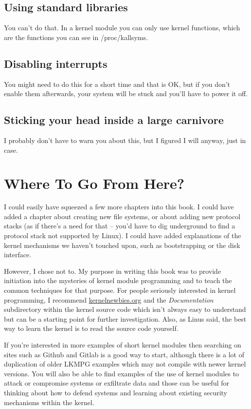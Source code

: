\documentclass[11pt]{article}
\begin{document}
\subsection{Using standard libraries}
\label{sec:orgba512d5}
You can't do that. In a kernel module you can only use kernel functions, which are the functions you can see in /proc/kallsyms.

\subsection{Disabling interrupts}
\label{sec:org377e4a8}
You might need to do this for a short time and that is OK, but if you don't enable them afterwards, your system will be stuck and you'll have to power it off.

\subsection{Sticking your head inside a large carnivore}
\label{sec:orgc0f5914}
I probably don't have to warn you about this, but I figured I will anyway, just in case.

\section{Where To Go From Here?}
\label{sec:org0a4192c}
I could easily have squeezed a few more chapters into this book. I could have added a chapter about creating new file systems, or about adding new protocol stacks (as if there's a need for that -- you'd have to dig underground to find a protocol stack not supported by Linux). I could have added explanations of the kernel mechanisms we haven't touched upon, such as bootstrapping or the disk interface.

However, I chose not to. My purpose in writing this book was to provide initiation into the mysteries of kernel module programming and to teach the common techniques for that purpose. For people seriously interested in kernel programming, I recommend \href{https://kernelnewbies.org}{kernelnewbies.org} and the \emph{Documentation} subdirectory within the kernel source code which isn't always easy to understand but can be a starting point for further investigation. Also, as Linus said, the best way to learn the kernel is to read the source code yourself.

If you're interested in more examples of short kernel modules then searching on sites such as Github and Gitlab is a good way to start, although there is a lot of duplication of older LKMPG examples which may not compile with newer kernel versions. You will also be able to find examples of the use of kernel modules to attack or compromise systems or exfiltrate data and those can be useful for thinking about how to defend systems and learning about existing security mechanisms within the kernel.
\end{document}
